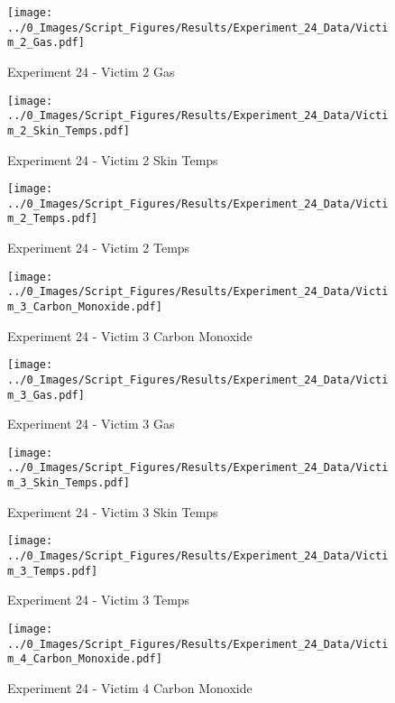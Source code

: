 	\clearpage

	\begin{figure}[H]
		\centering
		\texttt{[image: ../0\_Images/Script\_Figures/Results/Experiment\_24\_Data/Victim\_2\_Gas.pdf]}
		\caption[]{Experiment 24 - Victim 2 Gas}
	\end{figure}
 

	\begin{figure}[H]
		\centering
		\texttt{[image: ../0\_Images/Script\_Figures/Results/Experiment\_24\_Data/Victim\_2\_Skin\_Temps.pdf]}
		\caption[]{Experiment 24 - Victim 2 Skin Temps}
	\end{figure}
 
	\clearpage

	\begin{figure}[H]
		\centering
		\texttt{[image: ../0\_Images/Script\_Figures/Results/Experiment\_24\_Data/Victim\_2\_Temps.pdf]}
		\caption[]{Experiment 24 - Victim 2 Temps}
	\end{figure}
 

	\begin{figure}[H]
		\centering
		\texttt{[image: ../0\_Images/Script\_Figures/Results/Experiment\_24\_Data/Victim\_3\_Carbon\_Monoxide.pdf]}
		\caption[]{Experiment 24 - Victim 3 Carbon Monoxide}
	\end{figure}
 
	\clearpage

	\begin{figure}[H]
		\centering
		\texttt{[image: ../0\_Images/Script\_Figures/Results/Experiment\_24\_Data/Victim\_3\_Gas.pdf]}
		\caption[]{Experiment 24 - Victim 3 Gas}
	\end{figure}
 

	\begin{figure}[H]
		\centering
		\texttt{[image: ../0\_Images/Script\_Figures/Results/Experiment\_24\_Data/Victim\_3\_Skin\_Temps.pdf]}
		\caption[]{Experiment 24 - Victim 3 Skin Temps}
	\end{figure}
 
	\clearpage

	\begin{figure}[H]
		\centering
		\texttt{[image: ../0\_Images/Script\_Figures/Results/Experiment\_24\_Data/Victim\_3\_Temps.pdf]}
		\caption[]{Experiment 24 - Victim 3 Temps}
	\end{figure}
 

	\begin{figure}[H]
		\centering
		\texttt{[image: ../0\_Images/Script\_Figures/Results/Experiment\_24\_Data/Victim\_4\_Carbon\_Monoxide.pdf]}
		\caption[]{Experiment 24 - Victim 4 Carbon Monoxide}
	\end{figure}
 
